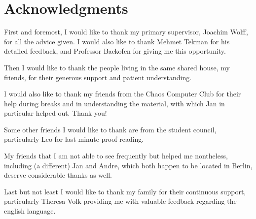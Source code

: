\chapter{Acknowledgments}

First and foremost, I would like to thank my primary supervisor, Joachim Wolff,
for all the advice given. I would also like to thank Mehmet Tekman for his
detailed feedback, and Professor Backofen for giving me this opportunity.

Then I would like to thank the people living in the same shared house, my
friends, for their generous support and patient understanding.

I would also like to thank my friends from the Chaos Computer Club for their
help during breaks and in understanding the material, with which Jan in
particular helped out. Thank you!

Some other friends I would like to thank are from the student council,
particularly Leo for last-minute proof reading.

My friends that I am not able to see frequently but helped me nontheless,
including (a different) Jan and Andre, which both happen to be located in
Berlin, deserve considerable thanks as well.

Last but not least I would like to thank my family for their continuous
support, particularly Theresa Volk providing me with valuable feedback
regarding the english language.

